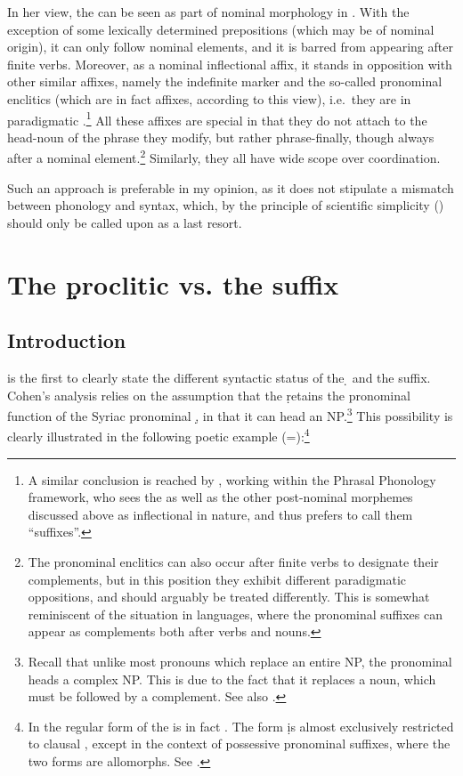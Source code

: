 In her view, the \ez* can be seen as part of nominal morphology in . With the exception of some lexically determined prepositions (which may be of nominal origin), it can only follow nominal elements, and it is barred from appearing after finite verbs. Moreover, as a nominal inflectional affix, it stands in opposition with other similar affixes, namely the indefinite marker   and the so-called pronominal enclitics (which are in fact affixes, according to this view), i.e.\ they are in paradigmatic .\footnote{A similar conclusion is reached by \citet[338f.]{Kahnemuyipour2003}, working within the Phrasal Phonology framework, who sees the \ez* as well as the other post-nominal morphemes discussed above as inflectional in nature, and thus prefers to call them \enquote{suffixes}.} All these affixes are special in that they do not attach to the head-noun of the phrase they modify, but rather phrase-finally, though always after a nominal element.\footnote{The pronominal enclitics can also occur after finite verbs to designate their complements, but in this position they exhibit different paradigmatic oppositions, and should arguably be treated differently. This is somewhat reminiscent of the situation in  languages, where the pronominal suffixes can appear as complements both after verbs and nouns.} Similarly, they all have wide scope over coordination.

Such an approach is preferable in my opinion, as it does not stipulate a mismatch between phonology and syntax, which, by the principle of scientific simplicity () should only be called upon as a last resort. 


\section{The \d proclitic vs. the \ed suffix} \label{ss:d_vs_ed}
\largerpage
\subsection{Introduction}

\citet{CohenNucleus} is the first to clearly state the different syntactic status of the \d {} and the \ed suffix. Cohen's analysis relies on the assumption that the  \d  retains the pronominal function of the Syriac pronominal \lnk* \d, in that it can head an NP.\footnote{Recall that unlike most pronouns which replace an entire NP, the pronominal \lnk* heads a complex NP. This is due to the fact that it replaces a \cst* noun, which must be followed by a complement. See also .}
 This possibility is clearly illustrated in the following poetic \Qar example (=):\footnote{In \JZax the regular form of the \lnk* is in fact . The form \d is almost exclusively restricted to clausal \secns, except in the context of possessive pronominal suffixes, where the two forms are allomorphs. See .}  

